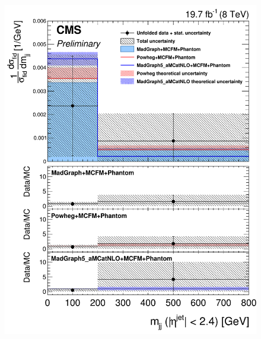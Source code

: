 \begin{figure}[hbtp]
  \begin{center}
    \includegraphics[width=\cmsFigWidth]{Figures/DiffCrossSecZZTo4mCentralMjj_Unfolded_fr_MadGraph_norm.png}     

\end{center}
\end{figure}
